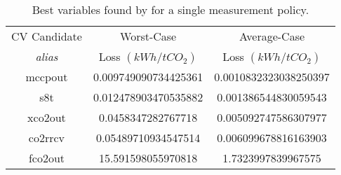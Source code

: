 \documentclass[../../msc-thesis.tex]{subfiles}
\begin{document}
\begin{table}[htb]
	\centering
	\caption{Best \soc variables found by \mtc for a single measurement policy.}	
	\begin{tabular}{c c c}
	\hline
	CV Candidate  & Worst-Case  & Average-Case  \\ 
    \textit{alias} 
	& Loss $(kWh/tCO_{2})$ & Loss $(kWh/tCO_{2})$ \\ \hline
	mccpout & \num{0.009749090734425361} & \num{0.0010832323038250397} \\
	s8t & \num{0.012478903470535882} & \num{0.001386544830059543} \\
	xco2out & \num{0.0458347282767718} & \num{0.005092747586307977} \\
	co2rrcv & \num{0.05489710934547514} & \num{0.006099678816163903} \\
	fco2out & \num{15.591598055970818} & \num{1.7323997839967575} \\ \hline
    \end{tabular}
    {
    }
	\label{tab:bestcvscpu1}
\end{table}

\FloatBarrier
\end{document}
